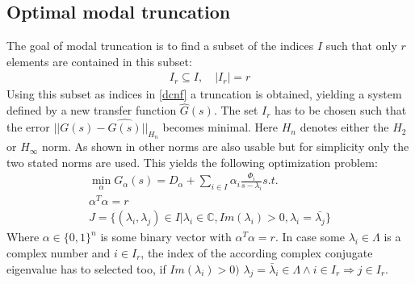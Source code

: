 \subsection{Optimal modal truncation}
The goal of modal truncation is to find a subset of the indices \(I\)  such that only \(r\) elements are contained in this subset:
\begin{gather}
I_r \subseteq I, \quad |I_r| = r
\end{gather}
Using this subset as indices in \ref{dcnf} a truncation is obtained, yielding a system defined by a new transfer function \(\hat{G}(s)\).
The set \(I_r\) has to be chosen such that the error \(||G(s) - \hat{G(s)}||_{H_n}\) becomes minimal.
Here  \(H_n\) denotes either the \(H_2\) or \(H_{\infty}\) norm.
As shown in \cite{vuillemin2020optimal} other norms are also usable but for simplicity only the two stated norms are used.
This yields the following optimization problem:
\begin{gather}
\min_{\alpha} G_{\alpha}(s) = D_{\alpha} + \sum_{i \in I} \alpha_i \frac{\Phi_i}{s - \lambda_i} s.t.\\
\alpha^{T}\alpha = r \\
J = \{(\lambda_i, \lambda_j) \in I | \lambda_i \in \mathbb{C}, Im(\lambda_i) > 0, \lambda_i = \bar{\lambda_j}\}
\end{gather}
Where \(\alpha \in \{0, 1\}^{n}\) is some binary vector with \(\alpha^{T} \alpha = r\).
In case some \(\lambda_i \in \Lambda\) is a complex number and \(i \in I_r\), the index of the according complex conjugate eigenvalue has to selected too, if \(Im(\lambda_i) > 0)\) \(\lambda_j = \bar{\lambda}_i \in \Lambda \wedge i \in I_r \Rightarrow j \in I_r\). 




